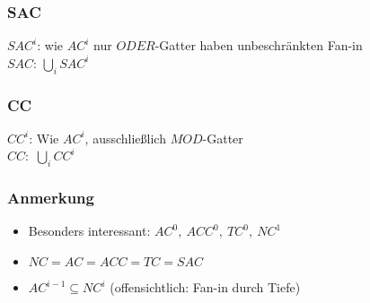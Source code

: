         \subsubsection{SAC}
            $SAC^i$: wie $AC^i$ nur $ODER$-Gatter haben unbeschränkten Fan-in\\
            $SAC$: $\bigcup\limits_i SAC^i$
        \subsubsection{CC}
            $CC^i$: Wie $AC^i$, ausschließlich $MOD$-Gatter\\
            $CC:$ $\bigcup\limits_i CC^i$
        \subsubsection{Anmerkung}
        \begin{itemize}
            \item Besonders interessant: $AC^0,\ ACC^0,\ TC^0,\ NC^1$
            \item $NC=AC=ACC=TC=SAC$
            \item $AC^{i-1}\subseteq NC^i$ (offensichtlich: Fan-in durch Tiefe)
        \end{itemize}

